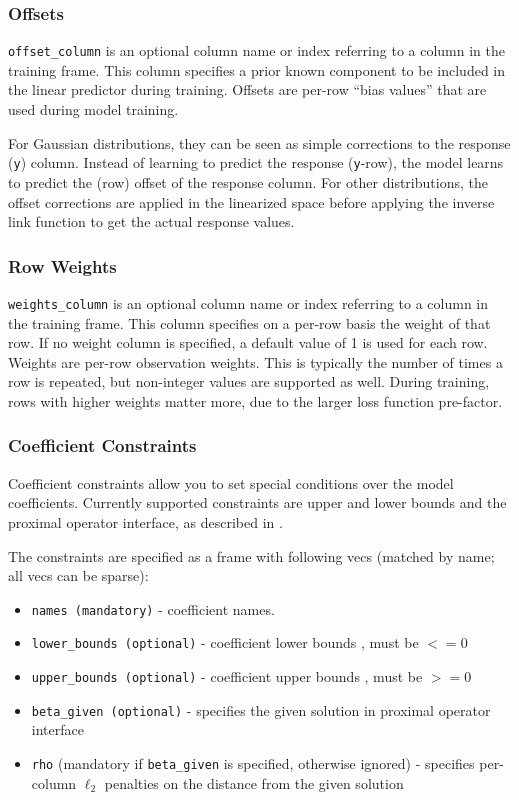 \subsubsection{Offsets}

\texttt{offset\_column} is an optional column name or index referring to a column in the training frame. This column specifies a prior known component to be included in the linear predictor during training. Offsets are per-row “bias values” that are used during model training. 

For Gaussian distributions, they can be seen as simple corrections to the response (\texttt{y}) column. Instead of learning to predict the response (\texttt{y}-row), the model learns to predict the (row) offset of the response column. For other distributions, the offset corrections are applied in the linearized space before applying the inverse link function to get the actual response values.  

\subsubsection{Row Weights}

\texttt{weights\_column} is an optional column name or index referring to a column in the training frame. This column specifies on a per-row basis the weight of that row.  If no weight column is specified, a default value of 1 is used for each row. Weights are per-row observation weights. This is typically the number of times a row is repeated, but non-integer values are supported as well. During training, rows with higher weights matter more, due to the larger loss function pre-factor.

\subsubsection{Coefficient Constraints}

Coefficient constraints allow you to set special conditions over the model coefficients. Currently supported
constraints are upper and lower bounds and the proximal operator interface, as described in .

The constraints are specified as a frame with following vecs (matched by name; all vecs can be sparse):

\begin{itemize}
\item \texttt{names (mandatory)}  - coefficient names. 
\item \texttt{lower\_bounds (optional)} - coefficient lower bounds , must be $<= 0$
\item \texttt{upper\_bounds (optional)} - coefficient upper bounds , must be $>= 0$
\item \texttt{beta\_given (optional)} - specifies the given solution in proximal operator interface
\item \texttt{rho} (mandatory if \texttt{beta\_given} is specified, otherwise ignored) - specifies per-column  $\ell_2$ penalties on the distance from the given solution
\end{itemize}
 
